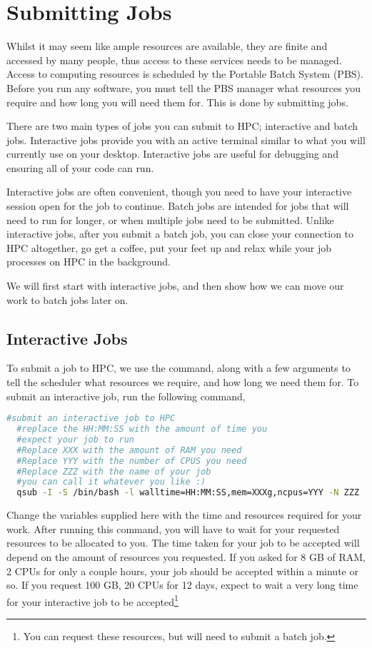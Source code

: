 \section{Submitting Jobs}
% 
% 
%
Whilst it may seem like ample resources are available, they are finite and accessed by many people, thus access to these services needs to be managed. Access to computing resources is scheduled by the Portable Batch System (PBS). Before you run any software, you must tell the PBS manager what resources you require and how long you will need them for. This is done by submitting jobs.
%
%
\par
%
%
There are two main types of jobs you can submit to HPC; interactive and batch jobs. Interactive jobs provide you with an active terminal similar to what you will currently use on your desktop. Interactive jobs are useful for debugging and ensuring all of your code can run.
%
%
\par
%
%
Interactive jobs are often convenient, though you need to have your interactive session open for the job to continue. Batch jobs are intended for jobs that will need to run for longer, or when multiple jobs need to be submitted. Unlike interactive jobs, after you submit a batch job, you can close your connection to HPC altogether, go get a coffee, put your feet up and relax while your job processes on HPC in the background.
%
%
%
\par
We will first start with interactive jobs, and then show how we can move our work to batch jobs later on.
%
%
%
\subsection{Interactive Jobs}
To submit a job to HPC, we use the  command, along with a few arguments to tell the scheduler what resources we require, and how long we need them for. To submit an interactive job, run the following command,
\newpage
\begin{lstlisting}[language=bash, frame=single, breaklines=true]
  #submit an interactive job to HPC
  #replace the HH:MM:SS with the amount of time you
  #expect your job to run
  #Replace XXX with the amount of RAM you need
  #Replace YYY with the number of CPUS you need
  #Replace ZZZ with the name of your job
  #you can call it whatever you like :)
  qsub -I -S /bin/bash -l walltime=HH:MM:SS,mem=XXXg,ncpus=YYY -N ZZZ
\end{lstlisting}
%
%
Change the variables supplied here with the time and resources required for your work. After running this command, you will have to wait for your requested resources to be allocated to you. The time taken for your job to be accepted will depend on the amount of resources you requested. If you asked for 8 GB of RAM, 2 CPUs for only a couple hours, your job should be accepted within a minute or so. If you request 100 GB, 20 CPUs for 12 days, expect to wait a very long time for your interactive job to be accepted\footnote{You can request these resources, but will need to submit a batch job.}

